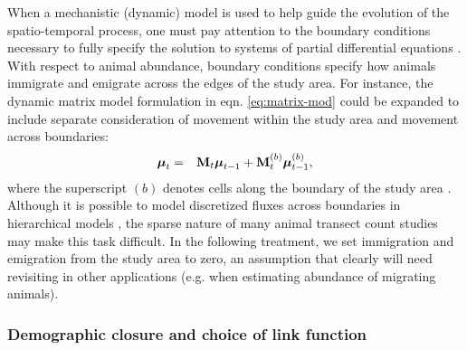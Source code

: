 \documentclass[times,mee,doublespace,]{besauth2}
\begin{document}
When a mechanistic (dynamic) model is used to help guide the evolution of the spatio-temporal process, one must pay attention to the boundary conditions necessary to fully specify the solution to systems of partial differential equations \citep[see e.g.][]{Haberman1998}.  With respect to animal abundance, boundary conditions specify how animals immigrate and emigrate across the edges of the study area.  For instance, the dynamic matrix model formulation in eqn. \ref{eq:matrix-mod} could be expanded to include separate consideration of movement within the study area and movement across boundaries:
\begin{eqnarray*}
\boldsymbol{\mu}_t & = & {\bf M}_t  \boldsymbol{\mu}_{t-1} + {\bf M}_t^{(b)} \boldsymbol{\mu}_{t-1}^{(b)},
\end{eqnarray*}
where the superscript $(b)$ denotes cells along the boundary of the study area \citep[][Section 6.3.2]{CressieWikle2011}.   Although it is possible to model discretized fluxes across boundaries in hierarchical models \citep[see e.g.][]{WikleEtAl2003b}, the sparse nature of many animal transect count studies may make this task difficult.  In the following treatment, we set immigration and emigration from the study area to zero, an assumption that clearly will need revisiting in other applications (e.g. when estimating abundance of migrating animals).  

\subsubsection{Demographic closure and choice of link function}
\end{document}
